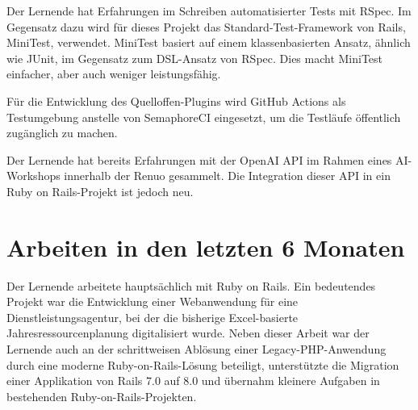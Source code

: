 Der Lernende hat Erfahrungen im Schreiben automatisierter Tests mit RSpec. Im Gegensatz dazu wird für dieses Projekt das Standard-Test-Framework von Rails, MiniTest, verwendet. MiniTest basiert auf einem klassenbasierten Ansatz, ähnlich wie JUnit, im Gegensatz zum DSL-Ansatz von RSpec. Dies macht MiniTest einfacher, aber auch weniger leistungsfähig.

Für die Entwicklung des Quelloffen-Plugins wird GitHub Actions als Testumgebung anstelle von SemaphoreCI eingesetzt, um die Testläufe öffentlich zugänglich zu machen.

Der Lernende hat bereits Erfahrungen mit der OpenAI API im Rahmen eines AI-Workshops innerhalb der Renuo gesammelt. Die Integration dieser API in ein Ruby on Rails-Projekt ist jedoch neu.

\section{Arbeiten in den letzten 6 Monaten}

Der Lernende arbeitete hauptsächlich mit Ruby on Rails. Ein bedeutendes Projekt war die Entwicklung einer Webanwendung für eine Dienstleistungsagentur, bei der die bisherige Excel-basierte Jahresressourcenplanung digitalisiert wurde. Neben dieser Arbeit war der Lernende auch an der schrittweisen Ablösung einer Legacy-PHP-Anwendung durch eine moderne Ruby-on-Rails-Lösung beteiligt, unterstützte die Migration einer Applikation von Rails 7.0 auf 8.0 und übernahm kleinere Aufgaben in bestehenden Ruby-on-Rails-Projekten.
